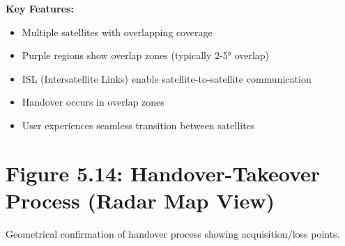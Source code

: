 \documentclass[11pt,letterpaper]{article}
\begin{document}
\textbf{Key Features:}
\begin{itemize}
    \item Multiple satellites with overlapping coverage
    \item Purple regions show overlap zones (typically 2-5° overlap)
    \item ISL (Intersatellite Links) enable satellite-to-satellite communication
    \item Handover occurs in overlap zones
    \item User experiences seamless transition between satellites
\end{itemize}

\newpage

\section*{Figure 5.14: Handover-Takeover Process (Radar Map View)}

Geometrical confirmation of handover process showing acquisition/loss points.
\end{document}
